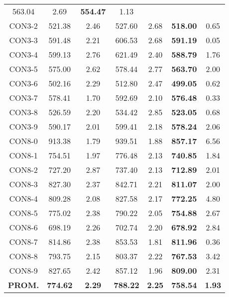 \begin{table}[ht]
\begin{tabular}{c c c c c c c}
563.04 & 2.69 & \bf{554.47} & 
1.13\\CON3-2 & 521.38 & 2.46 & 
527.60 & 2.68 & \bf{518.00} & 
0.65\\CON3-3 & 591.48 & 2.21 & 
606.53 & 2.68 & \bf{591.19} & 
0.05\\CON3-4 & 599.13 & 2.76 & 
621.49 & 2.40 & \bf{588.79} & 
1.76\\CON3-5 & 575.00 & 2.62 & 
578.44 & 2.77 & \bf{563.70} & 
2.00\\CON3-6 & 502.16 & 2.29 & 
512.80 & 2.47 & \bf{499.05} & 
0.62\\CON3-7 & 578.41 & 1.70 & 
592.69 & 2.10 & \bf{576.48} & 
0.33\\CON3-8 & 526.59 & 2.20 & 
534.42 & 2.85 & \bf{523.05} & 
0.68\\CON3-9 & 590.17 & 2.01 & 
599.41 & 2.18 & \bf{578.24} & 
2.06\\CON8-0 & 913.38 & 1.79 & 
939.51 & 1.88 & \bf{857.17} & 
6.56\\CON8-1 & 754.51 & 1.97 & 
776.48 & 2.13 & \bf{740.85} & 
1.84\\CON8-2 & 727.20 & 2.87 & 
737.40 & 2.13 & \bf{712.89} & 
2.01\\CON8-3 & 827.30 & 2.37 & 
842.71 & 2.21 & \bf{811.07} & 
2.00\\CON8-4 & 809.28 & 2.08 & 
827.58 & 2.17 & \bf{772.25} & 
4.80\\CON8-5 & 775.02 & 2.38 & 
790.22 & 2.05 & \bf{754.88} & 
2.67\\CON8-6 & 698.19 & 2.26 & 
702.74 & 2.20 & \bf{678.92} & 
2.84\\CON8-7 & 814.86 & 2.38 & 
853.53 & 1.81 & \bf{811.96} & 
0.36\\CON8-8 & 793.75 & 2.15 & 
803.37 & 2.22 & \bf{767.53} & 
3.42\\CON8-9 & 827.65 & 2.42 & 
857.12 & 1.96 & \bf{809.00} & 
2.31\\\bf{PROM.} & 
\bf{774.62} & \bf{2.29} & \bf{788.22} & \bf{2.25} & \bf{758.54} & \bf{1.93}\\[1ex]\hline
\end{tabular}
\label{table:nonlin}
\end{table} \clearpage
